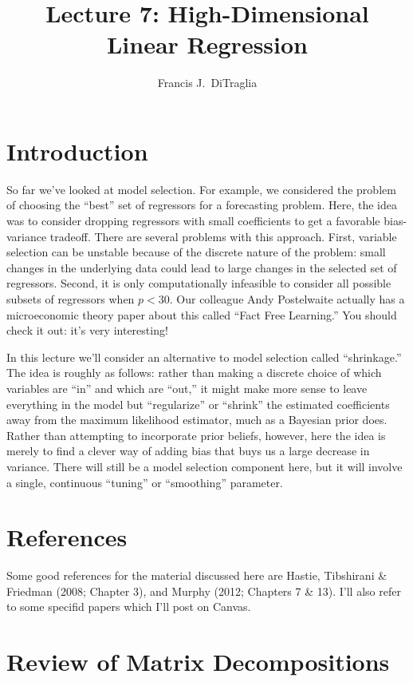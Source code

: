 \documentclass[12pt]{article}
\theoremstyle{definition}
\begin{document}
\title{Lecture 7: High-Dimensional Linear Regression}

\author{Francis J.\ DiTraglia}

\maketitle 

\section{Introduction}
So far we've looked at model selection. For example, we considered the problem of choosing the ``best'' set of regressors for a forecasting problem. Here, the idea was to consider dropping regressors with small coefficients to get a favorable bias-variance tradeoff. There are several problems with this approach. First, variable selection can be unstable because of the discrete nature of the problem: small changes in the underlying data could lead to large changes in the selected set of regressors. Second, it is only computationally infeasible to consider all possible subsets of regressors when $p < 30$. Our colleague Andy Postelwaite actually has a microeconomic theory paper about this called ``Fact Free Learning.'' You should check it out: it's very interesting!

In this lecture we'll consider an alternative to model selection called ``shrinkage.'' The idea is roughly as follows: rather than making a discrete choice of which variables are ``in'' and which are ``out,'' it might make more sense to leave everything in the model but ``regularize'' or ``shrink'' the estimated coefficients away from the maximum likelihood estimator, much as a Bayesian prior does. Rather than attempting to incorporate prior beliefs, however, here the idea is merely to find a clever way of adding bias that buys us a large decrease in variance. There will still be a model selection component here, but it will involve a single, continuous ``tuning'' or ``smoothing'' parameter.

\section{References}
Some good references for the material discussed here are Hastie, Tibshirani \& Friedman (2008; Chapter 3), and Murphy (2012; Chapters 7 \& 13). I'll also refer to some specifid papers which I'll post on Canvas.

\section{Review of Matrix Decompositions}
\end{document}
